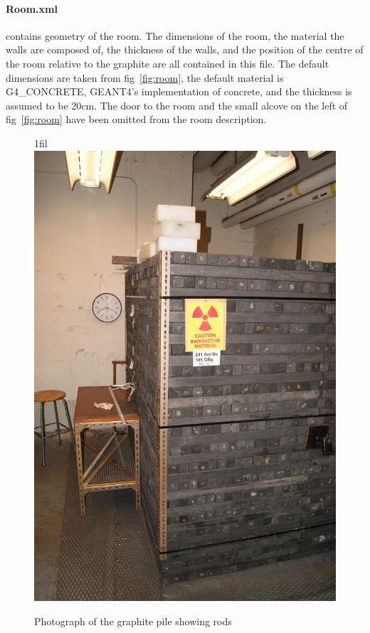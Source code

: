 \documentclass{article}
\makeatletter
\newcommand*{\centerfloat}{%
  \parindent \z@
  \leftskip \z@ \@plus 1fil \@minus \textwidth
  \rightskip\leftskip
  \parfillskip \z@skip}
\makeatother
\begin{document}
	\paragraph{Room.xml} contains geometry of the room. The dimensions of the room, the material the walls are composed of, the thickness of the walls, and the position of the centre of the room relative to the graphite are all contained in this file. The default dimensions are taken from fig~\ref{fig:room}, the default 
material is G4\_CONCRETE, GEANT4's implementation of concrete, and the thickness is assumed to be 20cm. The door to the room and the small alcove on the left of fig~\ref{fig:room} have been omitted from the room description.

\begin{figure}
	\centerfloat
	\includegraphics[width=\columnwidth]{images/Rods}
	\caption{Photograph of the graphite pile showing rods}	
	\label{fig:graphiteRods}
\end{figure}
\end{document}
